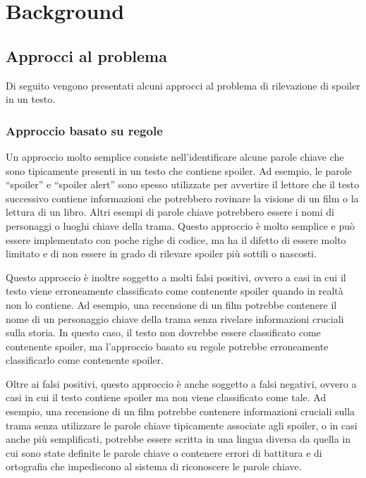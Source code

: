 \chapter{Background}
\label{ch:background}

\section{Approcci al problema}
\label{sec:approcci}

Di seguito vengono presentati alcuni approcci al problema
di rilevazione di spoiler in un testo.

\subsection{Approccio basato su regole}
\label{subsec:approccio-regole}

Un approccio molto semplice consiste nell'identificare
alcune parole chiave che sono tipicamente presenti in un
testo che contiene spoiler.
Ad esempio, le parole ``spoiler'' e ``spoiler alert'' sono
spesso utilizzate per avvertire il lettore che il testo
successivo contiene informazioni che potrebbero rovinare la
visione di un film o la lettura di un libro.
Altri esempi di parole chiave potrebbero essere i nomi di
personaggi o luoghi chiave della trama.
Questo approccio è molto semplice e può essere implementato
con poche righe di codice, ma ha il difetto di essere molto
limitato e di non essere in grado di rilevare spoiler più
sottili o nascosti.

Questo approccio è inoltre soggetto a molti falsi positivi,
ovvero a casi in cui il testo viene erroneamente
classificato come contenente spoiler quando in realtà non
lo contiene.
Ad esempio, una recensione di un film potrebbe contenere il
nome di un personaggio chiave della trama senza rivelare
informazioni cruciali sulla storia.
In questo caso, il testo non dovrebbe essere classificato
come contenente spoiler, ma l'approccio basato su regole
potrebbe erroneamente classificarlo come contenente
spoiler.

Oltre ai falsi positivi, questo approccio è anche soggetto
a falsi negativi, ovvero a casi in cui il testo contiene
spoiler ma non viene classificato come tale.
Ad esempio, una recensione di un film potrebbe contenere
informazioni cruciali sulla trama senza utilizzare le
parole chiave tipicamente associate agli spoiler, o in casi
anche più semplificati, potrebbe essere scritta in una
lingua diversa da quella in cui sono state definite le
parole chiave o contenere errori di battitura e di
ortografia che impediscono al sistema di riconoscere le
parole chiave.

